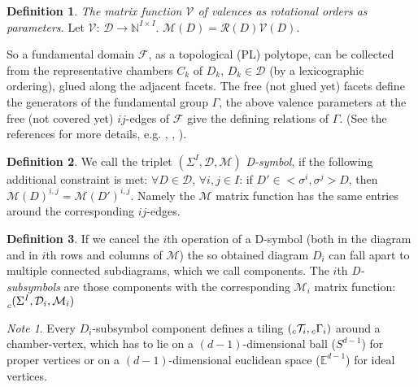 \documentclass[12pt,a4paper]{article}
\numberwithin{equation}{section}
\newcommand{\leftsub}[2]{{\vphantom{#2}}_{#1}{#2}}
\theoremstyle{plain}%
\theoremstyle{definition}
\newtheorem{defn}{Definition}[section]
\theoremstyle{remark}
\newtheorem*{note}{Note}
\begin{document}
\begin{defn}
  {\em The matrix function $\mathcal{V}$ of valences as rotational orders
  as parameters.}
  Let $\mathcal{V}$: $\mathcal{D} \rightarrow \mathbb{N}^{I\times I}$.
  $\mathcal{M}(D)=\mathcal{R}(D)\mathcal{V}(D)$.
\end{defn}

So a fundamental domain $\mathcal{F}$, as a topological (PL) polytope, can be collected
from the representative chambers $C_k$ of $D_k$, $D_k\in\mathcal{D}$ (by a
lexicographic ordering), glued along the adjacent facets. The free (not glued
yet) facets define the generators of the fundamental group $\Gamma$, the above
valence parameters at the free (not covered yet) $ij$-edges of $\mathcal{F}$
give the defining relations of $\Gamma$. (See the references for more details,
e.g. \cite{DHM93}, \cite{M96}, \cite{M11}).

\begin{defn}
  We call the triplet $(\Sigma^I,\mathcal{D},\mathcal{M})$ {\em D-symbol}, if the
  following additional constraint is met:
  $\forall D\in \mathcal{D}$, $\forall i,j\in I$: if $D' \in
  <\sigma^i,\sigma^j>D$, then $\mathcal{M}(D)^{i,j}=\mathcal{M}(D')^{i,j}$.
  Namely the $\mathcal{M}$ matrix function has the same entries around the
  corresponding $ij$-edges.
\end{defn}


\begin{defn}
  If we cancel the $i$th operation of a D-symbol (both in the diagram and in
  $i$th rows and columns of $\mathcal{M}$) the so obtained diagram $D_i$ can fall apart to multiple
  connected subdiagrams, which we call components. The $i$th {\em D-subsymbols} are
  those components with the corresponding $\mathcal{M}_i$ matrix function:
  $\leftsub{c}{(\Sigma^I,\mathcal{D}_i,\mathcal{M}_i)}$
\end{defn}

\begin{note}
  Every $D_i$-subsymbol component defines a tiling
  $(\leftsub{c}{\mathcal{T}}_i,\leftsub{c}{\Gamma}_i)$ around a chamber-vertex, which has to lie
  on a $(d-1)$-dimensional ball ($S^{d-1}$) for proper vertices or on a $(d-1)$-dimensional
  euclidean space ($\mathbb{E}^{d-1}$) for ideal vertices.
\end{note}
\end{document}
